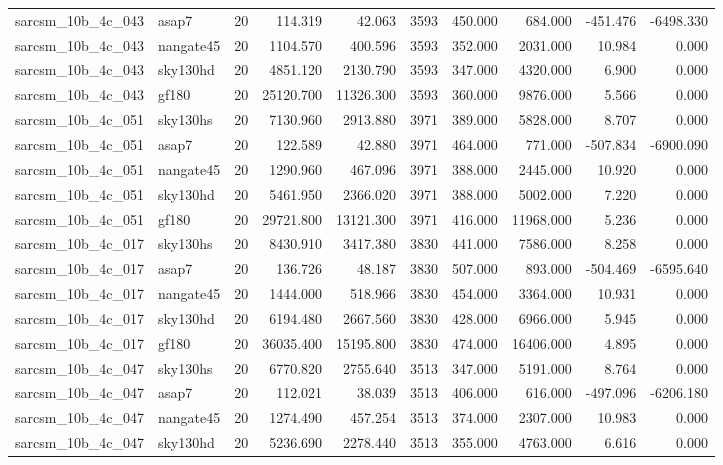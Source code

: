\begin{tabular}{llrrrrrrrr}
sarcsm\_10b\_4c\_043 & asap7 & 20 & 114.319 & 42.063 & 3593 & 450.000 & 684.000 & -451.476 & -6498.330 \\
sarcsm\_10b\_4c\_043 & nangate45 & 20 & 1104.570 & 400.596 & 3593 & 352.000 & 2031.000 & 10.984 & 0.000 \\
sarcsm\_10b\_4c\_043 & sky130hd & 20 & 4851.120 & 2130.790 & 3593 & 347.000 & 4320.000 & 6.900 & 0.000 \\
sarcsm\_10b\_4c\_043 & gf180 & 20 & 25120.700 & 11326.300 & 3593 & 360.000 & 9876.000 & 5.566 & 0.000 \\
sarcsm\_10b\_4c\_051 & sky130hs & 20 & 7130.960 & 2913.880 & 3971 & 389.000 & 5828.000 & 8.707 & 0.000 \\
sarcsm\_10b\_4c\_051 & asap7 & 20 & 122.589 & 42.880 & 3971 & 464.000 & 771.000 & -507.834 & -6900.090 \\
sarcsm\_10b\_4c\_051 & nangate45 & 20 & 1290.960 & 467.096 & 3971 & 388.000 & 2445.000 & 10.920 & 0.000 \\
sarcsm\_10b\_4c\_051 & sky130hd & 20 & 5461.950 & 2366.020 & 3971 & 388.000 & 5002.000 & 7.220 & 0.000 \\
sarcsm\_10b\_4c\_051 & gf180 & 20 & 29721.800 & 13121.300 & 3971 & 416.000 & 11968.000 & 5.236 & 0.000 \\
sarcsm\_10b\_4c\_017 & sky130hs & 20 & 8430.910 & 3417.380 & 3830 & 441.000 & 7586.000 & 8.258 & 0.000 \\
sarcsm\_10b\_4c\_017 & asap7 & 20 & 136.726 & 48.187 & 3830 & 507.000 & 893.000 & -504.469 & -6595.640 \\
sarcsm\_10b\_4c\_017 & nangate45 & 20 & 1444.000 & 518.966 & 3830 & 454.000 & 3364.000 & 10.931 & 0.000 \\
sarcsm\_10b\_4c\_017 & sky130hd & 20 & 6194.480 & 2667.560 & 3830 & 428.000 & 6966.000 & 5.945 & 0.000 \\
sarcsm\_10b\_4c\_017 & gf180 & 20 & 36035.400 & 15195.800 & 3830 & 474.000 & 16406.000 & 4.895 & 0.000 \\
sarcsm\_10b\_4c\_047 & sky130hs & 20 & 6770.820 & 2755.640 & 3513 & 347.000 & 5191.000 & 8.764 & 0.000 \\
sarcsm\_10b\_4c\_047 & asap7 & 20 & 112.021 & 38.039 & 3513 & 406.000 & 616.000 & -497.096 & -6206.180 \\
sarcsm\_10b\_4c\_047 & nangate45 & 20 & 1274.490 & 457.254 & 3513 & 374.000 & 2307.000 & 10.983 & 0.000 \\
sarcsm\_10b\_4c\_047 & sky130hd & 20 & 5236.690 & 2278.440 & 3513 & 355.000 & 4763.000 & 6.616 & 0.000 \\

\end{tabular}
